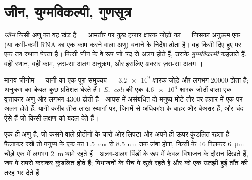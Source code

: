 \section{जीन, युग्मविकल्पी, गुणसूत्र}

\begin{definition}[जीन और युग्मविकल्पी]\label{def:g10:universal-dna:gene}
\emph{जीन} किसी  अणु का वह खंड है --- आमतौर पर कुछ हज़ार
क्षारक-जोड़ों का --- जिसका अनुक्रम एक  (या कभी-कभी RNA का एक
काम करने वाला अणु) बनाने के निर्देश ढोता है। वह किसी दिए हुए  पर
एक तय स्थान घेरता है। किसी जीन के वे रूप जो चंद  से अलग होते हैं,
उसके \emph{युग्मविकल्पी} कहलाते हैं: वही स्थान, वही काम, ज़रा-सा
अलग अनुक्रम, और इसलिए अक्सर ज़रा-सा अलग ।
\end{definition}

\begin{example}[अंक]\label{ex:g10:universal-dna:numbers}
मानव जीनोम --- यानी  का एक पूरा समुच्चय --- $\num{3.2e9}$
क्षारक-जोड़े और लगभग $\num{20000}$  ढोता है;  अनुक्रम का केवल
कुछ प्रतिशत घेरते हैं। \emph{E.~coli} की एक  $\num{4.6e6}$
क्षारक-जोड़ों वाला एक वृत्ताकार  अणु और लगभग 4300  ढोती है। आपस में
असंबंधित दो मनुष्य मोटे तौर पर हज़ार में एक  पर अलग होते हैं: यानी
क़रीब तीस लाख स्थानों पर, जिनमें से अधिकांश  के बाहर और बेअसर हैं,
और चंद ऐसे  हैं जो किसी लक्षण को बदल देते हैं।
\end{example}

\begin{proposition}[गुणसूत्र]\label{prop:g10:universal-dna:chromosome}
 एक ही  अणु है, जो कसने वाले प्रोटीनों के चारों ओर लिपटा और
अपने ही ऊपर कुंडलित रहता है। फैलाकर रखें तो मनुष्य के एक  का 
\qty{1.5}{cm} से \qty{8.5}{cm} तक लंबा होगा; किसी  के 46 
मिलकर \qty{6}{\micro m} चौड़े एक  में लगभग \qty{2}{m}  थामे
रहते हैं।  अलग-अलग पिंडों के रूप में केवल  विभाजन के दौरान
दिखते हैं, जब वे सबसे कसकर कुंडलित होते हैं; विभाजनों के बीच वे खुले रहते
हैं और  को एक उलझी हुई ताँत की तरह भर देते हैं।
\end{proposition}
\admitted

